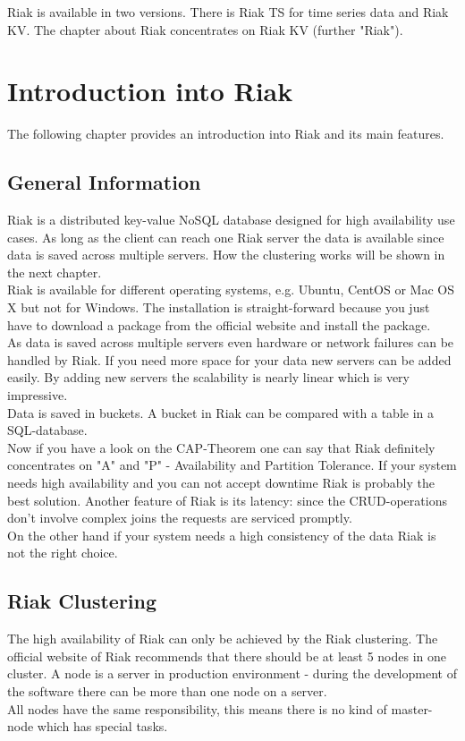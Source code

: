 Riak is available in two versions. There is Riak TS for time series data and Riak KV. The chapter about Riak concentrates on Riak KV (further "Riak").
\section{Introduction into Riak}
The following chapter provides an introduction into Riak and its main features. 
\subsection{General Information}
Riak is a distributed key-value NoSQL database designed for high availability use cases. As long as the client can reach one Riak server the data is available since data is saved across multiple servers. How the clustering works will be shown in the next chapter. \cite{Basho.06.04.2017}
\\
Riak is available for different operating systems, e.g. Ubuntu, CentOS or Mac OS X but not for Windows. The installation is straight-forward because you just have to download a package from the official website and install the package. \cite{Basho.06.04.2017}
\\ 
As data is saved across multiple servers even hardware or network failures can be handled by Riak. If you need more space for your data new servers can be added easily. By adding new servers the scalability is nearly linear which is very impressive. \cite{Basho.06.04.2017}
\\
Data is saved in buckets. A bucket in Riak can be compared with a table in a SQL-database. \cite{Basho.06.04.2017}
\\ 
Now if you have a look on the CAP-Theorem one can say that Riak definitely concentrates on "A" and "P" - Availability and Partition Tolerance. If your system needs high availability and you can not accept downtime Riak is probably the best solution. Another feature of Riak is its latency: since the CRUD-operations don't involve complex joins the requests are serviced promptly. \cite{Basho.06.04.2017}
\\
On the other hand if your system needs a high consistency of the data Riak is not the right choice. \cite{Basho.06.04.2017}
\subsection{Riak Clustering}
The high availability of Riak can only be achieved by the Riak clustering. The official website of Riak recommends that there should be at least 5 nodes in one cluster. A node is a server in production environment - during the development of the software there can be more than one node on a server. \cite{Basho.06.04.2017}
\\
All nodes have the same responsibility, this means there is no kind of master-node which has special tasks. \cite{Basho.06.04.2017}

